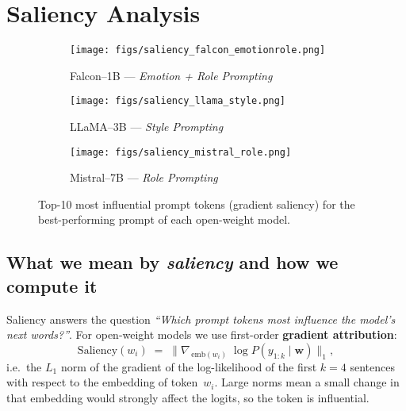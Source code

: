 \documentclass[12pt]{article}
\begin{document}
\section{Saliency Analysis}

\begin{figure}[H]
  \centering

  \begin{subfigure}{0.92\textwidth}
    \centering
    \texttt{[image: figs/saliency\_falcon\_emotionrole.png]}
    \caption{Falcon--1B — \textit{Emotion + Role Prompting}}
  \end{subfigure}\par\bigskip

  \begin{subfigure}{0.92\textwidth}
    \centering
    \texttt{[image: figs/saliency\_llama\_style.png]}
    \caption{LLaMA--3B — \textit{Style Prompting}}
  \end{subfigure}\par\bigskip

  \begin{subfigure}{0.92\textwidth}
    \centering
    \texttt{[image: figs/saliency\_mistral\_role.png]}
    \caption{Mistral--7B — \textit{Role Prompting}}
  \end{subfigure}

  \caption{Top-10 most influential prompt tokens (gradient saliency) for the
           best-performing prompt of each open-weight model.}
  \label{fig:top10_open}
\end{figure}



\subsection{What we mean by \textit{saliency} and how we compute it}
Saliency answers the question \emph{``Which prompt tokens most
influence the model’s next words?''}.  
For open-weight models we use first-order \textbf{gradient attribution}:
$$
\text{Saliency}(w_i)
   \;=\;
   \bigl\|
      \nabla_{\,\mathrm{emb}(w_i)} \;
      \log P(y_{1:k}\mid \mathbf{w})
   \bigr\|_1,
$$
i.e.\ the $L_1$ norm of the gradient of the log-likelihood of the first
$k=4$ sentences with respect to the embedding of token~$w_i$.
Large norms mean a small change in that embedding would strongly affect
the logits, so the token is influential.
\end{document}
